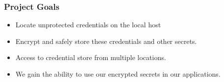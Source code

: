 \documentclass[aspectratio=169]{beamer}
\begin{document}
\begin{frame}
    \frametitle{Project Goals}
    \begin{itemize}
        \item Locate unprotected credentials on the local host
        \item Encrypt and safely store these credentials and other secrets.
        \item Access to credential store from multiple locations.
        \item We gain the ability to use our encrypted secrets in our applications.
    \end{itemize}


\end{frame}
\end{document}
